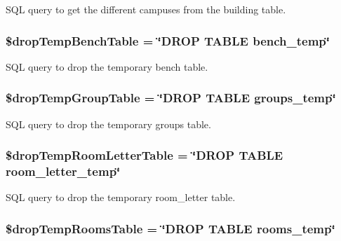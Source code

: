 \-S\-Q\-L query to get the different campuses from the building table. \hypertarget{manage_8php_abf1c8fc767af82673be54ca48a20e0d8}{
\subsubsection[{\$drop\-Temp\-Bench\-Table}]{\setlength{\rightskip}{0pt plus 5cm}\$drop\-Temp\-Bench\-Table = \char`\"{}\-D\-R\-O\-P \-T\-A\-B\-L\-E bench\-\_\-temp\char`\"{}}}\label{manage_8php_abf1c8fc767af82673be54ca48a20e0d8}
\-S\-Q\-L query to drop the temporary bench table. \hypertarget{manage_8php_a37871ad6099a27b6315fface9172c4d5}{
\subsubsection[{\$drop\-Temp\-Group\-Table}]{\setlength{\rightskip}{0pt plus 5cm}\$drop\-Temp\-Group\-Table = \char`\"{}\-D\-R\-O\-P \-T\-A\-B\-L\-E groups\-\_\-temp\char`\"{}}}\label{manage_8php_a37871ad6099a27b6315fface9172c4d5}
\-S\-Q\-L query to drop the temporary groups table. \hypertarget{manage_8php_a6d511c33a3f839e8b150f2df556d9cf0}{
\subsubsection[{\$drop\-Temp\-Room\-Letter\-Table}]{\setlength{\rightskip}{0pt plus 5cm}\$drop\-Temp\-Room\-Letter\-Table = \char`\"{}\-D\-R\-O\-P \-T\-A\-B\-L\-E room\-\_\-letter\-\_\-temp\char`\"{}}}\label{manage_8php_a6d511c33a3f839e8b150f2df556d9cf0}
\-S\-Q\-L query to drop the temporary room\-\_\-letter table. \hypertarget{manage_8php_ac3791b6f14bdbeeee37e52e7a7e8c98b}{
\subsubsection[{\$drop\-Temp\-Rooms\-Table}]{\setlength{\rightskip}{0pt plus 5cm}\$drop\-Temp\-Rooms\-Table = \char`\"{}\-D\-R\-O\-P \-T\-A\-B\-L\-E rooms\-\_\-temp\char`\"{}}}\label{manage_8php_ac3791b6f14bdbeeee37e52e7a7e8c98b}

